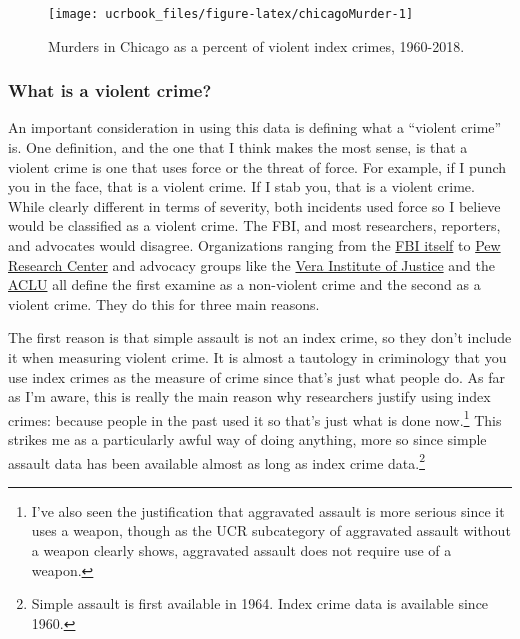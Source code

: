 \documentclass[
  12pt,
  openany]{book}
\begin{document}
\begin{figure}

{\centering \texttt{[image: ucrbook\_files/figure-latex/chicagoMurder-1]} 

}

\caption{Murders in Chicago as a percent of violent index crimes, 1960-2018.}\label{fig:chicagoMurder}
\end{figure}

\hypertarget{what-is-a-violent-crime}{%
\subsubsection{What is a violent crime?}\label{what-is-a-violent-crime}}

An important consideration in using this data is defining what a ``violent crime'' is. One definition, and the one that I think makes the most sense, is that a violent crime is one that uses force or the threat of force. For example, if I punch you in the face, that is a violent crime. If I stab you, that is a violent crime. While clearly different in terms of severity, both incidents used force so I believe would be classified as a violent crime. The FBI, and most researchers, reporters, and advocates would disagree. Organizations ranging from the \href{https://ucr.fbi.gov/crime-in-the-u.s/2019/crime-in-the-u.s.-2019/topic-pages/violent-crime}{FBI itself} to \href{https://www.pewresearch.org/fact-tank/2020/11/20/facts-about-crime-in-the-u-s/}{Pew Research Center} and advocacy groups like the \href{https://arresttrends.vera.org/data-sources-methodology}{Vera Institute of Justice} and the \href{https://www.aclu.org/report/tale-two-countries-racially-targeted-arrests-era-marijuana-reform}{ACLU} all define the first examine as a non-violent crime and the second as a violent crime. They do this for three main reasons.

The first reason is that simple assault is not an index crime, so they don't include it when measuring violent crime. It is almost a tautology in criminology that you use index crimes as the measure of crime since that's just what people do. As far as I'm aware, this is really the main reason why researchers justify using index crimes: because people in the past used it so that's just what is done now.\footnote{I've also seen the justification that aggravated assault is more serious since it uses a weapon, though as the UCR subcategory of aggravated assault without a weapon clearly shows, aggravated assault does not require use of a weapon.} This strikes me as a particularly awful way of doing anything, more so since simple assault data has been available almost as long as index crime data.\footnote{Simple assault is first available in 1964. Index crime data is available since 1960.}
\end{document}
